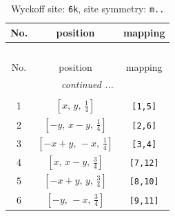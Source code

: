 \documentclass[fleqn,8pt]{jsarticle}
\begin{document}
\renewcommand{\arraystretch}{1.2}
\begin{longtable}{ccc}
\caption{Wyckoff site: {\tt 6k}, site symmetry: {\tt m..}}
 \\
 \hline \hline
No. & position & mapping \\ \hline \endfirsthead

\multicolumn{2}{l}{\tablename\ \thetable{}} \\
 \hline \hline
No. & position & mapping \\ \hline \endhead

 \hline \hline
\multicolumn{2}{r}{\footnotesize\it continued ...} \\ \endfoot

 \hline \hline
\multicolumn{2}{r}{} \\ \endlastfoot

1 & $\left[ x,\, y,\, \frac{1}{4} \right]$ & {\tt [1,5]} \\ \hline
2 & $\left[ - y,\, x - y,\, \frac{1}{4} \right]$ & {\tt [2,6]} \\ \hline
3 & $\left[ - x + y,\, - x,\, \frac{1}{4} \right]$ & {\tt [3,4]} \\ \hline
4 & $\left[ x,\, x - y,\, \frac{3}{4} \right]$ & {\tt [7,12]} \\ \hline
5 & $\left[ - x + y,\, y,\, \frac{3}{4} \right]$ & {\tt [8,10]} \\ \hline
6 & $\left[ - y,\, - x,\, \frac{3}{4} \right]$ & {\tt [9,11]} \\
\end{longtable}
\renewcommand{\arraystretch}{1.2}
\end{document}
